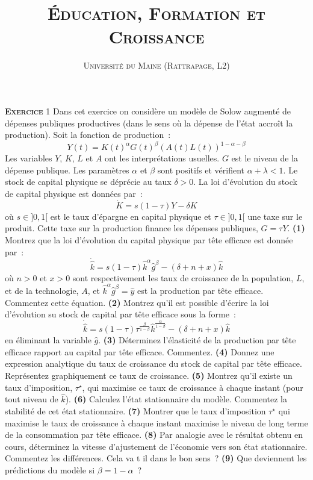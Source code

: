 \documentclass[10pt,a4paper,notitlepage]{article}
\newcommand{\exercice}[1]{\textsc{\textbf{Exercice}} #1}
\newcommand{\question}[1]{\textbf{(#1)}}
\begin{document}
\title{\textsc{Éducation, Formation et Croissance}}
\author{\textsc{Université du Maine (Rattrapage, L2)}}
\date{}

\maketitle

\exercice{1}  Dans  cet  exercice  on considère  un  modèle  de  Solow
augmenté de dépenses publiques productives (dans le sens où la dépense
de l'état accroît la production).  Soit la fonction de production :
\[
Y(t) = K(t)^{\alpha}G(t)^{\beta}(A(t)L(t))^{1-\alpha-\beta}
\]
Les variables $Y$,  $K$, $L$ et $A$ ont  les interprétations usuelles.
$G$ est le niveau de la  dépense publique.  Les paramètres $\alpha$ et
$\beta$ sont  positifs et  vérifient $\alpha+\lambda<1$.  Le  stock de
capital physique se  déprécie au taux $\delta>0$.   La loi d'évolution
du stock de capital physique est données par :
\[
\dot{K} = s (1-\tau)Y - \delta K
\]
où  $s\in]0,1[$  est   le  taux  d'épargne  en   capital  physique  et
$\tau\in]0,1[$ une taxe sur le  produit.  Cette taxe sur la production
finance les dépenses publiques, $G = \tau Y$. \question{1} Montrez que
la loi  d'évolution du capital  physique par tête efficace  est donnée
par :
\[
\dot{\hat{k}} = s(1-\tau)\hat{k}^{\alpha}\hat{g}^{\beta} - (\delta+n+x)\hat{k}
\]
où $n>0$  et $x>0$ sont  respectivement les  taux de croissance  de la
population,    $L$,     et    de     la    technologie,     $A$,    et
$\hat{k}^{\alpha}\hat{g}^{\beta}=\hat{y}$ est  la production  par tête
efficace.  Commentez cette  équation. \question{2}  Montrez qu'il  est
possible  d'écrire la  loi d'évolution  su stock  de capital  par tête
efficace sous la forme :
\[
\dot{\hat{k}} = s(1-\tau)\tau^{\frac{\beta}{1-\beta}}\hat{k}^{\frac{\alpha}{1-\beta}} - (\delta+n+x)\hat{k}
\]
en   éliminant  la   variable  $\hat   g$.   \question{3}   Déterminez
l'élasticité de la production par tête efficace rapport au capital par
tête  efficace.    Commentez.   \question{4}  Donnez   une  expression
analytique  du  taux  de  croissance  du stock  de  capital  par  tête
efficace.       Représentez     graphiquement      ce     taux      de
croissance. \question{5}  Montrez qu'il  existe un  taux d'imposition,
$\tau^{\star}$, qui  maximise ce taux  de croissance à  chaque instant
(pour  tout  niveau  de   $\hat  k$).   \question{6}  Calculez  l'état
stationnaire  du   modèle.   Commentez   la  stabilité  de   cet  état
stationnaire.    \question{7}  Montrer   que   le  taux   d'imposition
$\tau^{\star}$ qui  maximise le  taux de  croissance à  chaque instant
maximise  le  niveau  de  long  terme  de  la  consommation  par  tête
efficace. \question{8} Par analogie avec  le résultat obtenu en cours,
déterminez  la  vitesse  d'ajustement  de  l'économie  vers  son  état
stationnaire.  Commentez les  différences. Cela  va t  il dans  le bon
sens ? \question{9} Que deviennent les prédictions du modèle si $\beta = 1-\alpha$ ?
\end{document}
